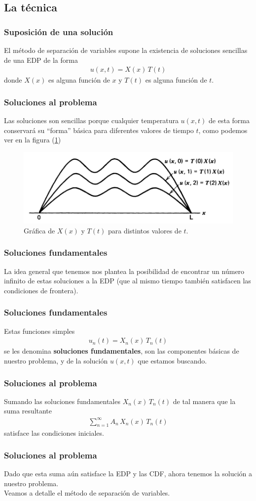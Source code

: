 \subsection{La técnica}
\begin{frame}
\frametitle{Suposición de una solución}
El método de separación de variables supone la existencia de soluciones sencillas de una EDP de la forma
\begin{align*}
u(x, t) =  X(x) \, T(t)
\end{align*}
donde $X (x)$ es alguna función de $x$ y $T (t)$ es alguna función de $t$.
\end{frame}
\begin{frame}
\frametitle{Soluciones al problema}
Las soluciones son sencillas porque cualquier temperatura $u (x, t)$ de esta forma conservará su \enquote{forma} básica para diferentes valores de tiempo $t$, como podemos ver en la figura (\ref{fig:figura_separacion_variables_01})
\begin{figure}[H]
    \centering
    \includegraphics[scale=0.25]{Imagenes/Separacion_Variables_01.png}
    \caption{Gráfica de $X(x)$ y $T(t)$ para distintos valores de $t$.}
    \label{fig:figura_separacion_variables_01}
\end{figure}
\end{frame}
\begin{frame}
\frametitle{Soluciones fundamentales}
La idea general que tenemos nos plantea la posibilidad de encontrar un número infinito de estas soluciones a la EDP (que al mismo tiempo también satisfacen las condiciones de frontera).
\end{frame}
\begin{frame}
\frametitle{Soluciones fundamentales}
Estas funciones simples
\begin{align*}
u_{n} (t) = X_{n} (x) \, T_{n}(t)
\end{align*}
se les denomina \textbf{soluciones fundamentales}, son las componentes básicas de nuestro problema, y de la solución $u (x, t)$ que estamos buscando.
\end{frame}
\begin{frame}
\frametitle{Soluciones al problema}
Sumando las soluciones fundamentales $X_{n}(x) \, T_{n} (t)$ de tal manera que la suma resultante
\begin{align*}
\sum_{n=1}^{\infty} A_{n} \, X_{n} (x) \, T_{n} (t)
\end{align*}
satisface las condiciones iniciales.
\end{frame}
\begin{frame}
\frametitle{Soluciones al problema}
Dado que esta suma aún satisface la EDP y las CDF, ahora tenemos la solución a nuestro problema.
\\
\bigskip
\pause
Veamos a detalle el método de separación de variables.
\end{frame}
